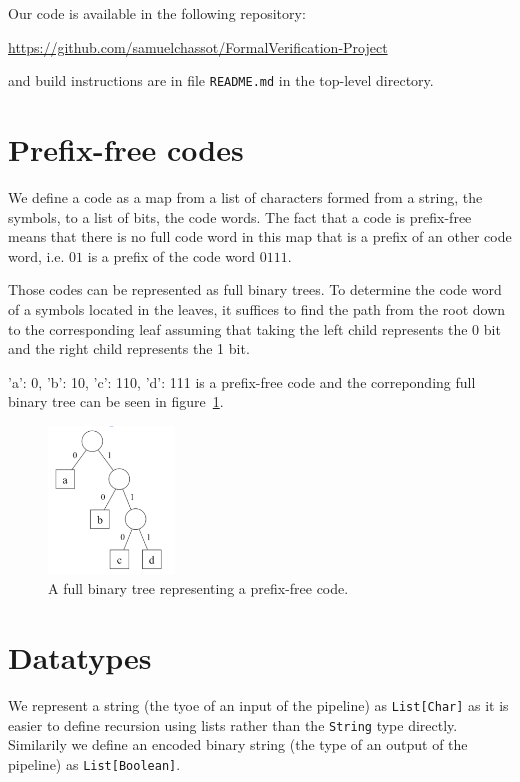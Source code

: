 \documentclass[a4paper,UKenglish,cleveref, autoref, thm-restate]{lipics-v2021}
\begin{document}
Our code is available in the following repository:
\begin{center}
    \url{https://github.com/samuelchassot/FormalVerification-Project}
\end{center}
and build instructions are in file \verb|README.md| in the top-level directory.

\section{Prefix-free codes}

We define a code as a map from a list of characters formed from a string, the symbols, to a list of bits, the code words. The fact that a code is prefix-free means that there is no full code word in this map that is a prefix of an other code word, i.e. $01$ is a prefix of the code word $0111$.

Those codes can be represented as full binary trees. To determine the code word of a symbols located in the leaves, it suffices to find the path from the root down to the corresponding leaf assuming that taking the left child represents the 0 bit and the right child represents the 1 bit.

{'a': 0, 'b': 10, 'c': 110, 'd': 111} is a prefix-free code and the correponding full binary tree can be seen in figure~\ref{fig:pfc}.
\begin{figure}[ht]
    \centering
    \includegraphics[width=0.3\textwidth]{pfc.png}
    \caption{A full binary tree representing a prefix-free code.\label{fig:pfc}}
\end{figure}

\section{Datatypes}

We represent a string (the tyoe of an input of the pipeline) as \lstinline{List[Char]} as it is easier to define recursion using lists rather than the \lstinline{String} type directly. 
Similarily we define an encoded binary string (the type of an output of the pipeline) as \lstinline{List[Boolean]}.
\end{document}
